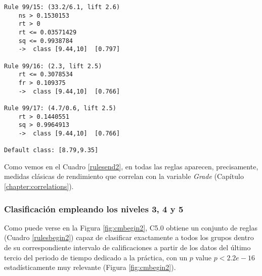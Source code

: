 \begin{tcolorbox}[title=Reglas de clasificación para identificar intervalos de notas.]
\begin{multicols}{3}
\begin{verbatim}
Rule 99/15: (33.2/6.1, lift 2.6)
	ns > 0.1530153
	rt > 0
	rt <= 0.03571429
	sq <= 0.9938784
	->  class [9.44,10]  [0.797]

Rule 99/16: (2.3, lift 2.5)
	rt <= 0.3078534
	fr > 0.109375
	->  class [9.44,10]  [0.766]

Rule 99/17: (4.7/0.6, lift 2.5)
	rt > 0.1440551
	sq > 0.9964913
	->  class [9.44,10]  [0.766]
	
Default class: [8.79,9.35]
    \end{verbatim}
  \end{multicols}
\end{tcolorbox}

Como vemos en el Cuadro \ref{rulesend2}, en todas las reglas aparecen, precisamente, medidas clásicas de rendimiento que correlan con la variable \emph{Grade} (Capítulo \ref{chapter:correlations}).

\subsubsection{Clasificación empleando los niveles 3, 4 y 5}

Como puede verse en la Figura \ref{fig:cmbegin2}, C5.0 obtiene un conjunto de reglas (Cuadro \ref{rulesbegin2}) capaz de clasificar exactamente a todos los grupos dentro de su correspondiente intervalo de calificaciones a partir de los datos del último tercio del periodo de tiempo dedicado a la práctica, con un $p$ value $p < 2.2e-16$ estadísticamente muy relevante (Figura \ref{fig:cmbegin2}).

